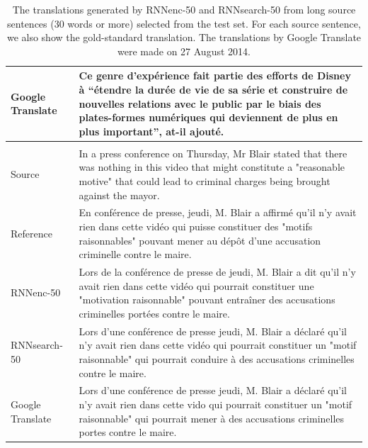 \documentclass{article} %
\begin{document}
\begin{table}[htp]
\begin{minipage}{0.99\textwidth}
\begin{tabular}{p{1.9cm} | p{12cm}}
\\
\hline Google \mbox{Translate} & Ce genre d'exp\'erience fait partie des efforts de Disney
à ``\'etendre la dur\'ee de vie de sa s\'erie et construire de nouvelles relations avec
le public par le biais des plates-formes num\'eriques qui deviennent de plus en
plus important'', at-il ajout\'e.
\\
\hline
\multicolumn{2}{c}{} \\
\hline Source & 
In a press conference on Thursday, Mr Blair stated that there was nothing in
this video that might constitute a "reasonable motive" that could lead to
criminal charges being brought against the mayor.
\\
\hline Reference & En conf\'erence de presse, jeudi, M. Blair a affirm\'e qu'il n'y avait rien dans cette vid\'eo qui puisse constituer des "motifs raisonnables" pouvant mener au d\'ep\^ot d'une accusation criminelle contre le maire.
\\
\hline RNNenc-50 & Lors de la conf\'erence de presse de jeudi, M. Blair a dit qu'il n'y avait rien dans cette vid\'eo qui pourrait constituer une "motivation raisonnable" pouvant entraîner des accusations criminelles port\'ees contre le maire.
\\
\hline RNNsearch-50 & Lors d'une conf\'erence de presse jeudi, M. Blair a d\'eclar\'e qu'il n'y avait rien dans cette vid\'eo qui pourrait constituer un "motif raisonnable" qui pourrait conduire à des accusations criminelles contre le maire.
\\
\hline Google \mbox{Translate} & 
Lors d'une conf\'erence de presse jeudi, M. Blair a d\'eclar\'e qu'il n'y avait rien
dans cette vido qui pourrait constituer un "motif raisonnable" qui pourrait
mener à des accusations criminelles portes contre le maire.
\\
\hline
        \end{tabular}
    \end{minipage}
    \caption{The translations generated by RNNenc-50 and RNNsearch-50 from long
        source sentences (30 words or more) selected from the test set. For each
        source sentence, we also show the gold-standard translation.  The
        translations by Google Translate were made on 27 August 2014.
}

\label{tab:translations}
\end{table}
\end{document}
